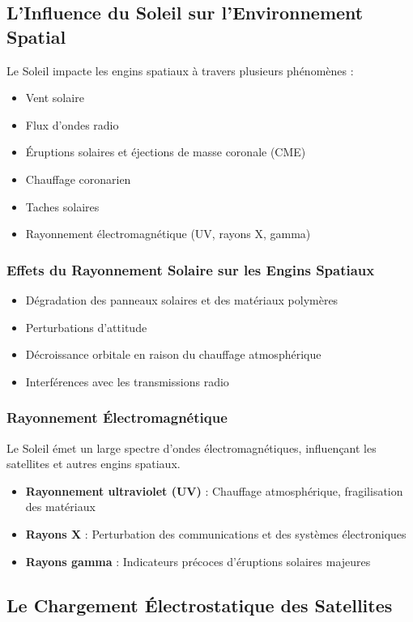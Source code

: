 \subsection{L’Influence du Soleil sur l’Environnement Spatial}
Le Soleil impacte les engins spatiaux à travers plusieurs phénomènes :
\begin{itemize}
    \item Vent solaire
    \item Flux d’ondes radio
    \item Éruptions solaires et éjections de masse coronale (CME)
    \item Chauffage coronarien
    \item Taches solaires
    \item Rayonnement électromagnétique (UV, rayons X, gamma)
\end{itemize}

\subsubsection{Effets du Rayonnement Solaire sur les Engins Spatiaux}
\begin{itemize}
    \item Dégradation des panneaux solaires et des matériaux polymères
    \item Perturbations d’attitude
    \item Décroissance orbitale en raison du chauffage atmosphérique
    \item Interférences avec les transmissions radio
\end{itemize}

\subsubsection{Rayonnement Électromagnétique}
Le Soleil émet un large spectre d’ondes électromagnétiques, influençant les satellites et autres engins spatiaux.
\begin{itemize}
    \item \textbf{Rayonnement ultraviolet (UV)} : Chauffage atmosphérique, fragilisation des matériaux
    \item \textbf{Rayons X} : Perturbation des communications et des systèmes électroniques
    \item \textbf{Rayons gamma} : Indicateurs précoces d’éruptions solaires majeures
\end{itemize}

\subsection{Le Chargement Électrostatique des Satellites}
